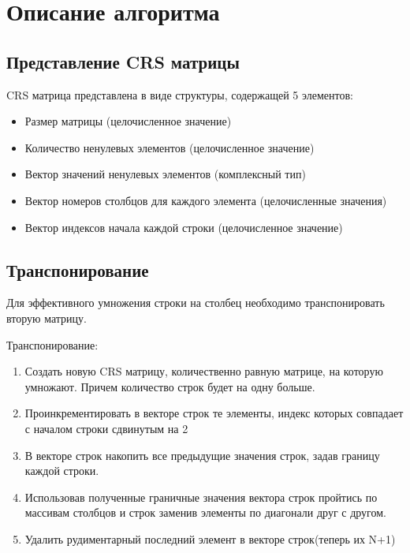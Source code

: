 \documentclass{report}
\begin{document}
\newpage
\section*{Описание алгоритма}

\subsection*{Представление CRS матрицы}
\par CRS матрица представлена в виде структуры, содержащей 5 элементов:
\begin{itemize}
\item Размер матрицы (целочисленное значение)
\item Количество ненулевых элементов (целочисленное значение)
\item Вектор значений ненулевых элементов (комплексный тип)
\item Вектор номеров столбцов для каждого элемента (целочисленные значения)
\item Вектор индексов начала каждой строки (целочисленное значение)
\end{itemize}
\subsection*{Транспонирование}
\par Для эффективного умножения строки на столбец необходимо транспонировать вторую матрицу.
\par Транспонирование:
\begin{enumerate}
\item Создать новую CRS матрицу, количественно равную матрице, на которую умножают. Причем количество строк будет на одну больше.
\item Проинкрементировать в векторе строк те элементы, индекс которых совпадает с началом строки сдвинутым на 2
\item В векторе строк накопить все предыдущие значения строк, задав границу каждой строки.
\item Использовав полученные граничные значения вектора строк пройтись по массивам столбцов и строк заменив элементы по диагонали друг с другом.
\item Удалить рудиментарный последний элемент в векторе строк(теперь их N+1)
\end{enumerate}
\newpage
\end{document}
